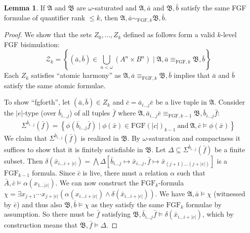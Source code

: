 \documentclass[draft]{scrartcl}
\theoremstyle{definition}
\newtheorem{lemma}[theorem]{Lemma}
\newcommand{\str}[1]{\mathfrak{#1}}
\begin{document}
\begin{lemma}
  If $\str{A}$ and $\str{B}$ are $\omega$-saturated and $\str{A}, \bar{a}$ and $\str{B}, \bar{b}$ satisfy the same FGF formulae of quantifier rank $\le k$, then $\str{A}, \bar{a} \sim_{\mathrm{FGF}, k} \str{B}, \bar{b}$.
\end{lemma}
\begin{proof}
  We show that the sets $Z_{0}, \ldots, Z_{k}$ defined as follows form a valid $k$-level FGF bisimulation:
  \begin{equation*}
  \mathcal{Z}_{k} = \left\{ (\bar{a}, \bar{b}) \in \bigcup_{n < \omega} (A^{n} \times B^{n}) \mid \str{A}, \bar{a} \equiv_{\mathrm{FGF},k} \str{B},\bar{b} \right\}
  \end{equation*}
  Each $Z_{k}$ satisfies ``atomic harmony'' as $\str{A}, \bar{a} \equiv_{\mathrm{FGF},k} \str{B},\bar{b}$ implies that $\bar{a}$ and $\bar{b}$ satisfy the same atomic formulae.

  To show ``fgforth'', let $(\bar{a}, \bar{b}) \in Z_{k}$ and $\bar{c} = \bar{a}_{i\ldots{}j}\bar{e}$ be a live tuple in $\str{A}$.
  Consider the $|e|$-type (over $\bar{b}_{i\ldots{}j}$) of all tuples $\bar{f}$ where $\str{A}, \bar{a}_{i\ldots{}j}\bar{e} \equiv_{\mathrm{FGF},k-1} \str{B}, \bar{b}_{i\ldots{j}}\bar{f}$:
  \begin{align*}
    \Sigma^{\bar{b}_{i\ldots{j}}}(\bar{f}) = \left\{ \phi(\bar{b}_{i\ldots{}j}\bar{f}) \mid \phi(\bar{x}) \in {\mathrm{FGF}(|c|)}_{k-1}\ \text{and}\ \str{A}, \bar{c} \models \phi(\bar{x}) \right\}
  \end{align*}
  We claim that $\Sigma^{\bar{b}_{i\ldots{}j}}(\bar{f})$ is realized in $\str{B}$.
  By $\omega$-saturation and compactness it suffices to show that it is finitely satisfiable in $\str{B}$.
  Let $\Delta \subseteq \Sigma^{\bar{b}_{i\ldots{}j}}(\bar{f})$ be a finite subset.
  Then $\delta(\bar{x}_{i\ldots{}i+|c|}) = \bigwedge \Delta[\bar{b}_{i\ldots{}j} \mapsto \bar{x}_{i\ldots{}j}, \bar{f} \mapsto \bar{x}_{(j+1)\ldots{}(j+|e|)}]$ is a $\mathrm{FGF}_{k-1}$ formula.
  Since $\bar{c}$ is live, there must a relation $\alpha$ such that $\bar{A}, \bar{c} \models \alpha(x_{1\ldots{}|c|})$.
  We can now construct the $\mathrm{FGF}_{k}$-formula $\chi = \exists{x_{j+1}\cdots{}x_{j+|e|}} (\alpha(x_{i\ldots{}i+|c|}) \land \delta(\bar{x}_{i\ldots{}i+|c|}))$.
  We have $\str{A}, \bar{a} \models \chi$ (witnessed by $\bar{e}$) and thus also $\str{B}, \bar{b} \models \chi$ as they satisfy the same $\mathrm{FGF}_{k}$ formulae by assumption.
  So there must be $\bar{f}$ satisfying $\str{B}, \bar{b}_{i\ldots{}j}\bar{f} \models \delta(\bar{x}_{i\ldots{}i+|c|})$, which by construction means that $\str{B}, \bar{f} \models \Delta$.
\end{proof}
\end{document}
